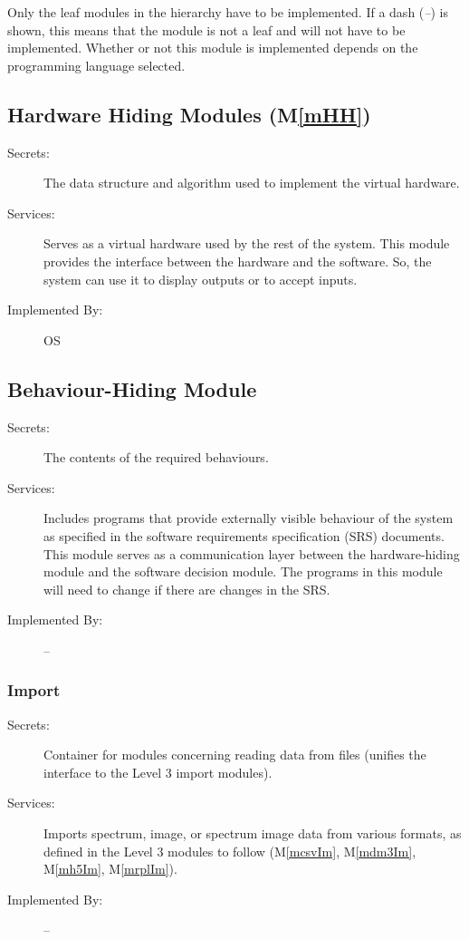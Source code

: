 \documentclass[12pt, titlepage]{article}
\newcommand{\mref}[1]{M\ref{#1}}
\begin{document}
Only the leaf modules in the
hierarchy have to be implemented. If a dash (\emph{--}) is shown, this means
that the module is not a leaf and will not have to be implemented. Whether or
not this module is implemented depends on the programming language
selected.

\subsection{Hardware Hiding Modules (\mref{mHH})}

\begin{description}
\item[Secrets:]The data structure and algorithm used to implement the virtual
  hardware.
\item[Services:]Serves as a virtual hardware used by the rest of the
  system. This module provides the interface between the hardware and the
  software. So, the system can use it to display outputs or to accept inputs.
\item[Implemented By:] OS
\end{description}

\subsection{Behaviour-Hiding Module}

\begin{description}
\item[Secrets:]The contents of the required behaviours.
\item[Services:]Includes programs that provide externally visible behaviour of
  the system as specified in the software requirements specification (SRS)
  documents. This module serves as a communication layer between the
  hardware-hiding module and the software decision module. The programs in this
  module will need to change if there are changes in the SRS.
\item[Implemented By:] --
\end{description}

\subsubsection{Import}
\begin{description}
	\item[Secrets:]Container for modules concerning reading data from files
    (unifies the interface to the Level 3 import modules).
	\item[Services:]Imports spectrum, image, or spectrum image data from various
formats, as defined in the Level 3 modules to follow (\mref{mcsvIm},
\mref{mdm3Im}, \mref{mh5Im}, \mref{mrplIm}). 
	\item[Implemented By:] --
\end{description}
\end{document}
